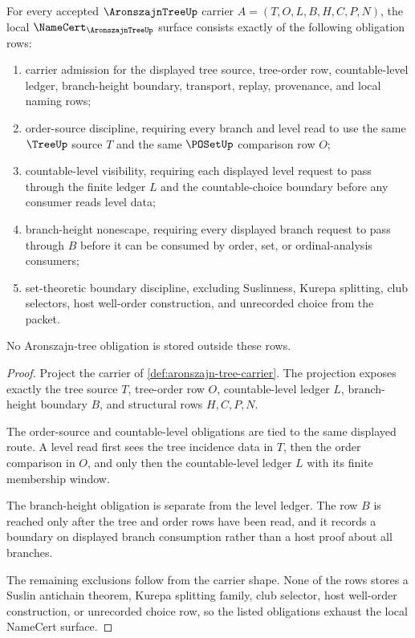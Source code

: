\begin{theorem}\label{thm:aronszajn-tree-namecert-obligations}
For every accepted $\AronszajnTreeUp$ carrier $A=(T,O,L,B,H,C,P,N)$, the local $\NameCert_{\AronszajnTreeUp}$ surface consists exactly of the following obligation rows:
\begin{enumerate}
\item carrier admission for the displayed tree source, tree-order row, countable-level ledger, branch-height boundary, transport, replay, provenance, and local naming rows;
\item order-source discipline, requiring every branch and level read to use the same $\TreeUp$ source $T$ and the same $\POSetUp$ comparison row $O$;
\item countable-level visibility, requiring each displayed level request to pass through the finite ledger $L$ and the countable-choice boundary before any consumer reads level data;
\item branch-height nonescape, requiring every displayed branch request to pass through $B$ before it can be consumed by order, set, or ordinal-analysis consumers;
\item set-theoretic boundary discipline, excluding Suslinness, Kurepa splitting, club selectors, host well-order construction, and unrecorded choice from the packet.
\end{enumerate}
No Aronszajn-tree obligation is stored outside these rows.
\end{theorem}
\begin{proof}
Project the carrier of \autoref{def:aronszajn-tree-carrier}. The projection exposes exactly the tree source $T$, tree-order row $O$, countable-level ledger $L$, branch-height boundary $B$, and structural rows $H,C,P,N$.

The order-source and countable-level obligations are tied to the same displayed route. A level read first sees the tree incidence data in $T$, then the order comparison in $O$, and only then the countable-level ledger $L$ with its finite membership window.

The branch-height obligation is separate from the level ledger. The row $B$ is reached only after the tree and order rows have been read, and it records a boundary on displayed branch consumption rather than a host proof about all branches.

The remaining exclusions follow from the carrier shape. None of the rows stores a Suslin antichain theorem, Kurepa splitting family, club selector, host well-order construction, or unrecorded choice row, so the listed obligations exhaust the local NameCert surface.
\end{proof}

